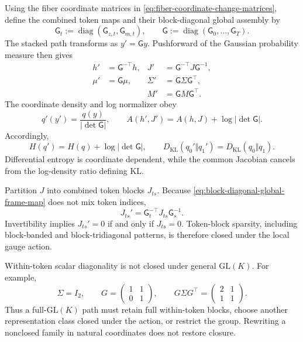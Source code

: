 Using the fiber coordinate matrices in \cref{eq:fiber-coordinate-change-matrices}, define the combined token maps and their block-diagonal global assembly by
\begin{equation}
\mathsf G_t
:=\operatorname{diag}(\mathsf G_{z,t},\mathsf G_{m,t}),
\qquad
\mathsf G
:=\operatorname{diag}(\mathsf G_0,\ldots,\mathsf G_T).
\label{eq:block-diagonal-global-frame-map}
\end{equation}
The stacked path transforms as $y'=\mathsf G y$.  Pushforward of the Gaussian probability measure then gives
\begin{equation}
\begin{aligned}
h'&=\mathsf G^{-\top}h,
&J'&=\mathsf G^{-\top}J\mathsf G^{-1},\\
\mu'&=\mathsf G\mu,
&\Sigma'&=\mathsf G\Sigma\mathsf G^\top,\\
&&M'&=\mathsf G M\mathsf G^\top.
\end{aligned}
\label{eq:joint-gaussian-gauge-laws}
\end{equation}
The coordinate density and log normalizer obey
\begin{equation}
q'(y')=\frac{q(y)}{|\det\mathsf G|},
\qquad
A(h',J')=A(h,J)+\log|\det\mathsf G|.
\label{eq:joint-density-log-normalizer-jacobian}
\end{equation}
Accordingly,
\begin{equation}
H(q')=H(q)+\log|\det\mathsf G|,
\qquad
D_{\mathrm{KL}}(q_0'\Vert q_1')
=D_{\mathrm{KL}}(q_0\Vert q_1).
\label{eq:entropy-shift-kl-invariance}
\end{equation}
Differential entropy is coordinate dependent, while the common Jacobian cancels from the log-density ratio defining KL.

Partition $J$ into combined token blocks $J_{ts}$.  Because \cref{eq:block-diagonal-global-frame-map} does not mix token indices,
\begin{equation}
J_{ts}'
=\mathsf G_t^{-\top}J_{ts}\mathsf G_s^{-1}.
\label{eq:precision-token-block-gauge-law}
\end{equation}
Invertibility implies $J_{ts}'=0$ if and only if $J_{ts}=0$.  Token-block sparsity, including block-banded and block-tridiagonal patterns, is therefore closed under the local gauge action.

Within-token scalar diagonality is not closed under general $\mathrm{GL}(K)$.  For example,
\begin{equation}
\Sigma=I_2,
\qquad
G=\begin{pmatrix}1&1\\0&1\end{pmatrix},
\qquad
G\Sigma G^\top
=\begin{pmatrix}2&1\\1&1\end{pmatrix}.
\label{eq:diagonal-covariance-nonclosure-example}
\end{equation}
Thus a full-$\mathrm{GL}(K)$ path must retain full within-token blocks, choose another representation class closed under the action, or restrict the group.  Rewriting a nonclosed family in natural coordinates does not restore closure.

